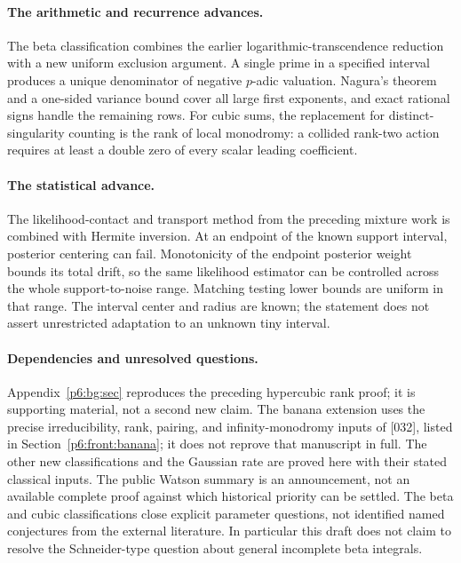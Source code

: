 \documentclass[11pt,a4paper]{article}
\theoremstyle{definition}
\theoremstyle{remark}
\numberwithin{equation}{section}
\begin{document}
\paragraph{The arithmetic and recurrence advances.}
The beta classification combines the earlier logarithmic-transcendence
reduction with a new uniform exclusion argument. A single prime in a
specified interval produces a unique denominator of negative $p$-adic
valuation. Nagura's theorem and a one-sided variance bound cover all
large first exponents, and exact rational signs handle the remaining
rows. For cubic sums, the replacement for distinct-singularity counting
is the rank of local monodromy: a collided rank-two action requires
at least a double zero of every scalar leading coefficient.

\paragraph{The statistical advance.}
The likelihood-contact and transport method from the preceding mixture
work \cite{p4:Keio029,p4:KeioEntropy2026} is combined with Hermite inversion.
At an endpoint of the known support interval, posterior centering can
fail. Monotonicity of the endpoint posterior weight bounds its total
drift, so the same likelihood estimator can be controlled across the
whole support-to-noise range. Matching testing lower bounds are uniform
in that range. The interval center and radius are known; the statement
does not assert unrestricted adaptation to an unknown tiny interval.

\paragraph{Dependencies and unresolved questions.}
Appendix~\ref{p6:bg:sec} reproduces the preceding hypercubic rank proof;
it is supporting material, not a second new claim. The banana extension
uses the precise irreducibility, rank, pairing, and infinity-monodromy
inputs of [032], listed in Section~\ref{p6:front:banana}; it does not
reprove that manuscript in full. The other new classifications and
the Gaussian rate are proved here with their stated classical inputs.
The public Watson summary is an announcement, not an available complete
proof against which historical priority can be settled. The beta and
cubic classifications close explicit parameter questions, not identified
named conjectures from the external literature. In particular this
draft does not claim to resolve the Schneider-type question about
general incomplete beta integrals.
\end{document}
